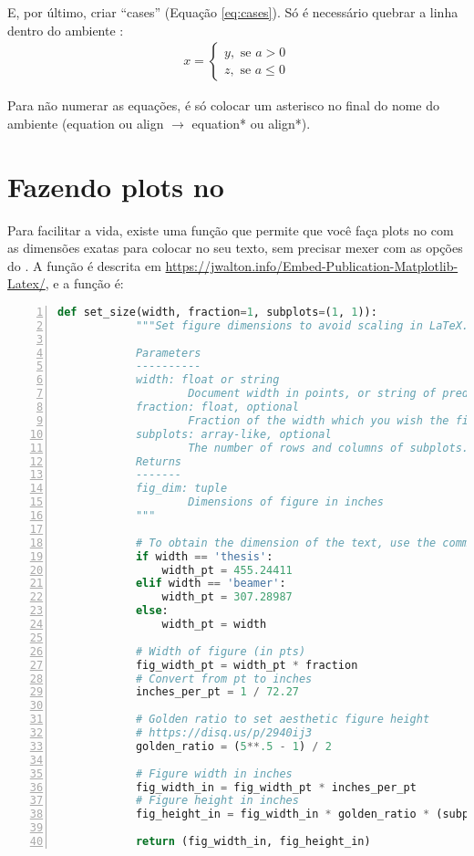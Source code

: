       E, por último, criar ``cases'' (Equação \eqref{eq:cases}). Só é necessário quebrar a linha dentro do ambiente :
      \begin{align}
        x =
        \begin{cases}
          y,\text{ se } a > 0 \\
          z,\text{ se } a \leq 0
        \end{cases}
        \label{eq:cases}
      \end{align}

      Para não numerar as equações, é só colocar um asterisco no final do nome do ambiente (equation ou align $\rightarrow$ equation* ou align*).

    \section{Fazendo plots no }
      Para facilitar a vida, existe uma função que permite que você faça plots no  com as dimensões exatas para colocar no seu texto, sem precisar mexer com as opções do . A função é descrita em \url{https://jwalton.info/Embed-Publication-Matplotlib-Latex/}, e a função é:
      \begin{lstlisting}[label=code, language=Python, numbers=left, autogobble]          
        def set_size(width, fraction=1, subplots=(1, 1)):
            """Set figure dimensions to avoid scaling in LaTeX.
        
            Parameters
            ----------
            width: float or string
                    Document width in points, or string of predined document type
            fraction: float, optional
                    Fraction of the width which you wish the figure to occupy
            subplots: array-like, optional
                    The number of rows and columns of subplots.
            Returns
            -------
            fig_dim: tuple
                    Dimensions of figure in inches
            """

            # To obtain the dimension of the text, use the command \the\linewidth somewhere in the TeX document
            if width == 'thesis':
                width_pt = 455.24411 
            elif width == 'beamer':
                width_pt = 307.28987
            else:
                width_pt = width
        
            # Width of figure (in pts)
            fig_width_pt = width_pt * fraction
            # Convert from pt to inches
            inches_per_pt = 1 / 72.27
        
            # Golden ratio to set aesthetic figure height
            # https://disq.us/p/2940ij3
            golden_ratio = (5**.5 - 1) / 2
        
            # Figure width in inches
            fig_width_in = fig_width_pt * inches_per_pt
            # Figure height in inches
            fig_height_in = fig_width_in * golden_ratio * (subplots[0] / subplots[1])
        
            return (fig_width_in, fig_height_in)
      \end{lstlisting}

